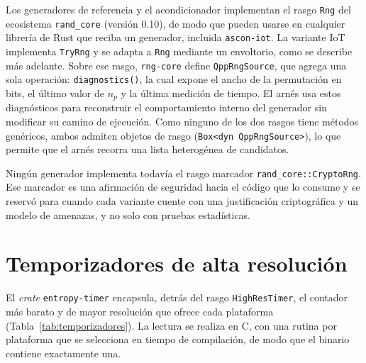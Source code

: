 Los generadores de referencia y el acondicionador implementan el rasgo \texttt{Rng} del ecosistema \texttt{rand\_core} (versión 0.10), de modo que pueden usarse en cualquier librería de Rust que reciba un generador, incluida \texttt{ascon-iot}. La variante IoT implementa \texttt{TryRng} y se adapta a \texttt{Rng} mediante un envoltorio, como se describe más adelante. Sobre ese rasgo, \texttt{rng-core} define \texttt{QppRngSource}, que agrega una sola operación: \texttt{diagnostics()}, la cual expone el ancho de la permutación en bits, el último valor de $n_p$ y la última medición de tiempo. El arnés usa estos diagnósticos para reconstruir el comportamiento interno del generador sin modificar su camino de ejecución. Como ninguno de los dos rasgos tiene métodos genéricos, ambos admiten objetos de rasgo (\texttt{Box<dyn QppRngSource>}), lo que permite que el arnés recorra una lista heterogénea de candidatos.

Ningún generador implementa todavía el rasgo marcador \texttt{rand\_core::CryptoRng}. Ese marcador es una afirmación de seguridad hacia el código que lo consume y se reservó para cuando cada variante cuente con una justificación criptográfica y un modelo de amenazas, y no solo con pruebas estadísticas.

\section{Temporizadores de alta resolución}

El \textit{crate} \texttt{entropy-timer} encapsula, detrás del rasgo \texttt{HighResTimer}, el contador más barato y de mayor resolución que ofrece cada plataforma (Tabla~\ref{tab:temporizadores}). La lectura se realiza en C, con una rutina por plataforma que se selecciona en tiempo de compilación, de modo que el binario contiene exactamente una.

